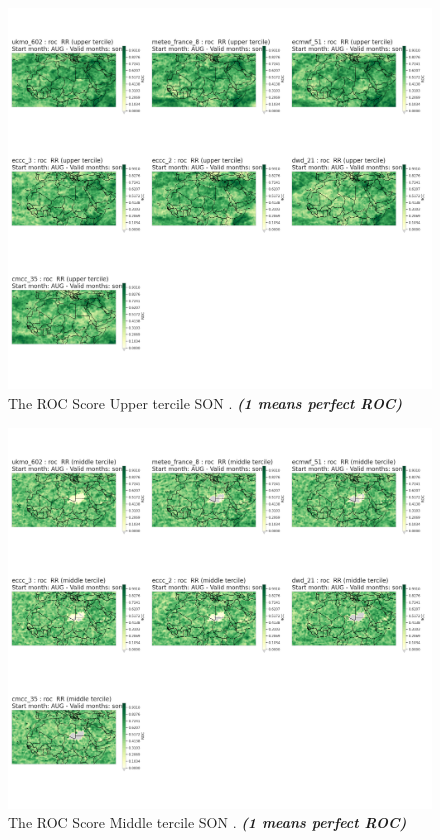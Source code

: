 \begin{figure}[H]
    \centering
    \includegraphics[scale=0.3]{plots/prob/roc/roc_son_RR_upper.png}
    \caption{The ROC Score Upper tercile SON    . \textbf{\textit{(1 means perfect ROC)}}}
\end{figure}


\begin{figure}[H]
    \centering
    \includegraphics[scale=0.3]{plots/prob/roc/roc_son_RR_middle.png}
    \caption{The ROC Score Middle tercile SON    . \textbf{\textit{(1 means perfect ROC)}}}
\end{figure}

